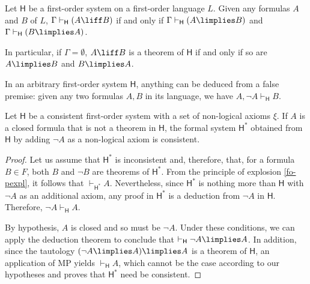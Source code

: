 \begin{proposition}
\label{foiff}
Let $\mathsf{H}$ be a first-order system on a first-order language $L$. Given any formulas $A$ and $B$ of $L$, $\Gamma \vdash_{\mathsf{H}} (A \liff B)$ if and only if $\Gamma \vdash_\mathsf{H} (A\limplies B)$ and $\Gamma \vdash_\mathsf{H} (B\limplies A)$.

In particular, if $\Gamma = \emptyset$, $A\liff B$ is a theorem of $\mathsf{H}$ if and only if so are $A\limplies B$ and $B\limplies A$.
\end{proposition}

\begin{proposition}
In an arbitrary first-order system $\mathsf{H}$, anything can be deduced from a false premise: given any two formulas $A,B$ in its language, we have $A,\lnot A \vdash_{\mathsf{H}} B$. 
\label{fo-pexpl}
\end{proposition}

\begin{lemma}
Let $\mathsf{H}$ be a consistent first-order system with a set of non-logical axioms $\xi$.
If $A$ is a closed formula that is not a theorem in $\mathsf{H}$, the formal system $\mathsf{H}^*$ obtained from $\mathsf{H}$ by adding $\lnot A$ as a non-logical axiom is consistent.
\label{notacons}
\end{lemma}

\begin{proof}
Let us assume that $\mathsf{H}^*$ is inconsistent and, therefore, that, for a formula $B\in F$, both $B$ and $\lnot B$ are theorems of $\mathsf{H}^*$.
From the principle of explosion \ref{fo-pexpl}, it follows that $\vdash_{\mathsf{H}^*} A$.
Nevertheless, since $\mathsf{H}^*$ is nothing more than $\mathsf{H}$ with $\lnot A$ as an additional axiom, any proof in $\mathsf{H}^*$ is a deduction from $\lnot A$ in $\mathsf{H}$.
Therefore, $\lnot A \vdash_\mathsf{H} A$.

By hypothesis, $A$ is closed and so must be $\lnot A$. Under these conditions, we can apply the deduction theorem to conclude that $\vdash_{\mathsf{H}} \lnot A \limplies A$. In addition, since the tautology $(\lnot A \limplies A)\limplies A$ is a theorem of $\mathsf{H}$, an application of MP yields $\vdash_{\mathsf{H}} A$, which cannot be the case according to our hypotheses and proves that $\mathsf{H}^*$ need be consistent.
\end{proof}


